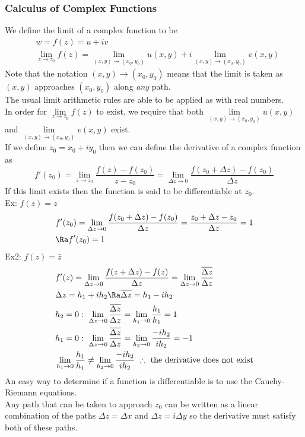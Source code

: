 \subsubsection{Calculus of Complex Functions}
We define the limit of a complex function to be
\begin{align*}
    &w=f(z)=u+iv\\
    &\lim_{z\to z_0}f(z)=\lim_{(x,y)\to(x_0,y_0)}u(x,y)+i\lim_{(x,y)\to(x_0,y_0)}v(x,y)
\end{align*}
Note that the notation $(x,y)\to(x_0,y_0)$ means that the limit is taken as $(x,y)$ approaches $(x_0,y_0)$ along \textit{any} path.\\
The usual limit arithmetic rules are able to be applied as with real numbers.\\
In order for
$\lim\limits_{z\to z_0}f(z)$
to exist, we require that both $\lim\limits_{(x,y)\to(x_0,y_0)}u(x,y)$ and $\lim\limits_{(x,y)\to(x_0,y_0)}v(x,y)$ exist.\\
If we define $z_0=x_0+iy_0$ then we can define the derivative of a complex function as
$$f'(z_0)=\lim_{z\to z_0}\frac{f(z)-f(z_0)}{z-z_0}=\lim_{\Delta z\to0}\frac{f(z_0+\Delta z)-f(z_0)}{\Delta z}$$
If this limit exists then the function is said to be differentiable at $z_0$.\\
Ex: $f(z)=z$
\begin{align*}
    &f'(z_0)=\lim_{\Delta z\to0}\frac{f(z_0+\Delta z)-f(z_0)}{\Delta z}=\frac{z_0+\Delta z-z_0}{\Delta z}=1\\
    &\Ra f'(z_0)=1
\end{align*}
Ex2: $f(z)=\bar{z}$
\begin{align*}
    &f'(z)=\lim_{\Delta z\to0}\frac{f(z+\Delta z)-f(z)}{\Delta z}=\lim_{\Delta z\to0}\frac{\overline{\Delta z}}{\Delta z}\\
    &\Delta z=h_1+ih_2\Ra \overline{\Delta z}=h_1-ih_2\\
    &h_2=0:\ \lim_{\Delta z\to0}\frac{\overline{\Delta z}}{\Delta z}=\lim_{h_1\to0}\frac{h_1}{h_1}=1\\
    &h_1=0:\ \lim_{\Delta z\to0}\frac{\overline{\Delta z}}{\Delta z}=\lim_{h_2\to0}\frac{-ih_2}{ih_2}=-1\\
    &\lim_{h_1\to0}\frac{h_1}{h_1}\neq\lim_{h_2\to0}\frac{-ih_2}{ih_2}\ \therefore\text{ the derivative does not exist}
\end{align*}
An easy way to determine if a function is differentiable is to use the Cauchy-Riemann equations.\\
Any path that can be taken to approach $z_0$ can be written as a linear combination of the paths $\Delta z=\Delta x$ and $\Delta z = i\Delta y$ so the derivative must satisfy both of these paths.
